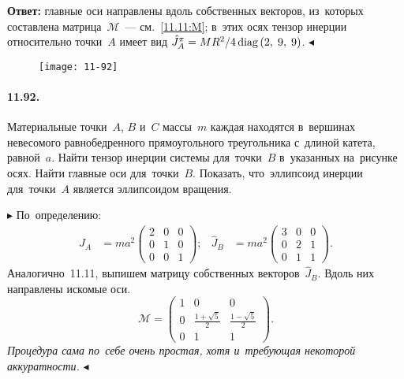 \documentclass{weekly}
\begin{document}
\textbf{Ответ:}
главные оси направлены вдоль собственных векторов, из~которых
составлена матрица~$\mathcal{M}$~--- см.~\eqref{11.11:M};
в~этих осях тензор инерции относительно точки~$A$ имеет вид
$\hat J_A^\pi = MR^2/4 \operatorname{diag} \left(2, \; 9, \; 9\right)$.
\hfill $\blacktriangleleft$


\clearpage
\begin{wrapfigure}[6]{r}{.2\textwidth}
    \texttt{[image: 11-92]}
\end{wrapfigure}
\paragraph{11.92.} Материальные точки~$A$, $B$ и~$C$ массы~$m$ каждая
находятся в~вершинах невесомого равнобедренного прямоугольного
треугольника с~длиной катета, равной~$a$. Найти тензор инерции системы
для~точки~$B$ в~указанных на~рисунке осях. Найти главные оси
для~точки~$B$. Показать, что~эллипсоид инерции для~точки~$A$
является эллипсоидом вращения.

$\blacktriangleright$ По~определению:
\begin{align}
    \hat J_A &= ma^2 \begin{pmatrix}
        2 & 0 & 0 \\
        0 & 1 & 0 \\
        0 & 0 & 1
    \end{pmatrix};
&
    \hat J_B &= ma^2 \begin{pmatrix}
        3 & 0 & 0 \\
        0 & 2 & 1 \\
        0 & 1 & 1
    \end{pmatrix}.
\end{align}
Аналогично~11.11, выпишем матрицу собственных векторов~$\hat J_B$.
Вдоль них направлены искомые оси.
\begin{equation}
    \mathcal{M} = \begin{pmatrix}
        1 & 0 & 0 \\
        0 & \frac{1 + \sqrt{5}}{2} & \frac{1 - \sqrt{5}}{2} \\
        0 & 1 & 1
    \end{pmatrix}.
\end{equation}
\emph{Процедура сама по~себе очень простая, хотя и~требующая
некоторой аккуратности.}
\hfill $\blacktriangleleft$
\end{document}
